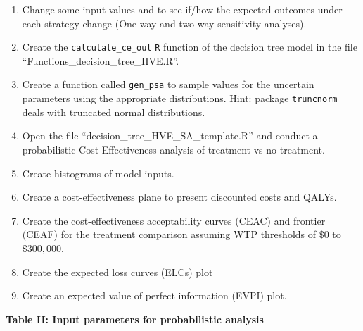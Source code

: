 \documentclass[
]{article}
\begin{document}
\begin{enumerate}
\def\labelenumi{\arabic{enumi}.}
\setcounter{enumi}{3}
\item
  Change some input values and to see if/how the expected outcomes under
  each strategy change (One-way and two-way sensitivity analyses).
\item
  Create the \texttt{calculate\_ce\_out} \texttt{R} function of the
  decision tree model in the file ``Functions\_decision\_tree\_HVE.R''.
\item
  Create a function called \texttt{gen\_psa} to sample values for the
  uncertain parameters using the appropriate distributions. Hint:
  package \texttt{truncnorm} deals with truncated normal distributions.
\item
  Open the file ``decision\_tree\_HVE\_SA\_template.R'' and conduct a
  probabilistic Cost-Effectiveness analysis of treatment vs
  no-treatment.
\item
  Create histograms of model inputs.
\item
  Create a cost-effectiveness plane to present discounted costs and
  QALYs.
\item
  Create the cost-effectiveness acceptability curves (CEAC) and frontier
  (CEAF) for the treatment comparison assuming WTP thresholds of \(\$0\)
  to \(\$300,000\).
\item
  Create the expected loss curves (ELCs) plot
\item
  Create an expected value of perfect information (EVPI) plot.
\end{enumerate}

\textbf{Table II: Input parameters for probabilistic analysis}
\end{document}
